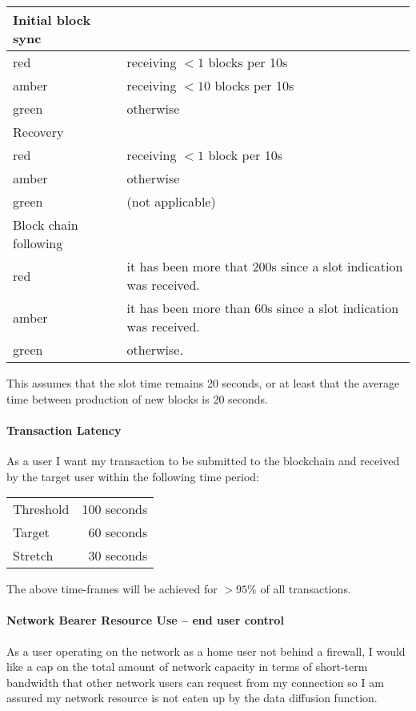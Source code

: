 %
\begin{center}
\begin{tabular}{ll}
Initial block sync \\
\hline
red   & receiving $<1$ blocks per 10s \\
amber & receiving $<10$ blocks per 10s \\
green & otherwise  \\[1em]

Recovery \\
\hline
red   & receiving $<1$ block per 10s \\
amber & otherwise  \\
green & (not applicable) \\[1em]

Block chain following \\
\hline
red   & it has been more that 200s since a slot indication was received. \\
amber & it has been more than 60s since a slot indication was received. \\
green & otherwise.
\end{tabular}
\end{center}

This assumes that the slot time remains 20 seconds, or at least that the average time
between production of new blocks is 20 seconds.

\paragraph{Transaction Latency}

As a user I want my transaction to be submitted to the blockchain and received
by the target user within the following time period:
%
\begin{center}
\begin{tabular}{lr}
Threshold & 100 seconds \\
Target    & 60 seconds  \\
Stretch   & 30 seconds  \\
\end{tabular}
\end{center}
%
The above time-frames will be achieved for $>95\%$ of all transactions.

\paragraph{Network Bearer Resource Use -- end user control}

As a user operating on the network as a home user not behind a firewall, I
would like a cap on the total amount of network capacity in terms of short-term
bandwidth that other network users can request from my connection so I am
assured my network resource is not eaten up by the data diffusion function.

